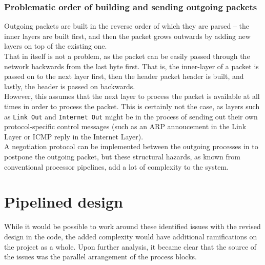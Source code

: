 \subsubsection{Problematic order of building and sending outgoing packets}
Outgoing packets are built in the reverse order of which they are parsed -- the
inner layers are built first, and then the packet grows outwards by adding new
layers on top of the existing one.\\
That in itself is not a problem, as the packet can be easily passed through the
network backwards from the last byte first. That is, the inner-layer of a packet
is passed on to the next layer first, then the header packet header is built,
and lastly, the header is passed on backwards.\\
However, this assumes that the next layer to process the packet is available at
all times in order to process the packet. This is certainly not the case, as
layers such as \texttt{Link Out} and \texttt{Internet Out} might be in the
process of sending out their own protocol-specific control messages (such as
an ARP annoucement in the Link Layer or ICMP reply in the Internet Layer).\\
A negotiation protocol can be implemented between the outgoing processes in to
postpone the outgoing packet, but these structural hazards, as known from
conventional processor pipelines, add a lot of complexity to the system.






\section{Pipelined design}
While it would be possible to work around these identified issues with the
revised design in the code, the
added complexity would have additional ramifications on the project as a whole.
Upon further analysis, it became clear that the source of the issues was
the parallel arrangement of the process blocks.

